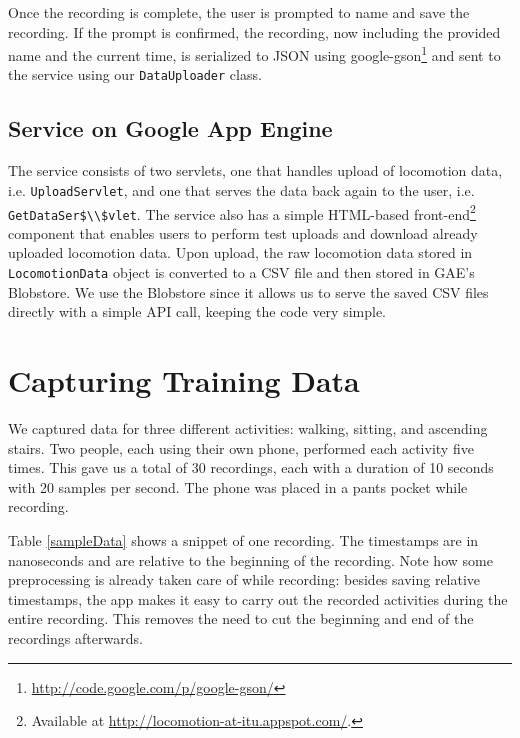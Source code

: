 \documentclass{ubicomp2012}
\begin{document}
Once the recording is complete, the user is prompted to name and save the recording. If the prompt is confirmed, the recording, now including the provided name and the current time, is serialized to JSON using google-gson\footnote{\url{http://code.google.com/p/google-gson/}} and sent to the service using our \lstinline[mathescape]{DataUploader} class.

\subsection{Service on Google App Engine}

The service consists of two servlets, one that handles upload of locomotion data, i.e. \lstinline[mathescape]{UploadServlet}, and one that serves the data back again to the user, i.e. \lstinline[mathescape]{GetDataSer$\\$vlet}. The service also has a simple HTML-based front-end\footnote{Available at \url{http://locomotion-at-itu.appspot.com/}.} component that enables users to perform test uploads and download already uploaded locomotion data. Upon upload, the raw locomotion data stored in \lstinline[mathescape]{LocomotionData} object is converted to a CSV file and then stored in GAE’s Blobstore. We use the Blobstore since it allows us to serve the saved CSV files directly with a simple API call, keeping the code very simple.

\section{Capturing Training Data}

We captured data for three different activities: walking, sitting, and ascending stairs. Two people, each using their own phone, performed each activity five times. This gave us a total of 30 recordings, each with a duration of 10 seconds with 20 samples per second. The phone was placed in a pants pocket while recording.

Table \ref{sampleData} shows a snippet of one recording. The timestamps are in nanoseconds and are relative to the beginning of the recording. Note how some preprocessing is already taken care of while recording: besides saving relative timestamps, the app makes it easy to carry out the recorded activities during the entire recording. This removes the need to cut the beginning and end of the recordings afterwards.
\end{document}
